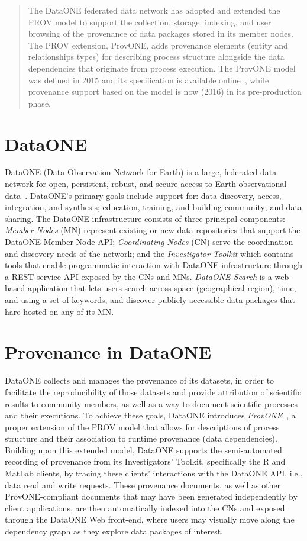 \documentclass[a4paper]{llncs}
\begin{document}
\begin{abstract}
The DataONE federated data network has adopted and extended the PROV model to support the collection, storage, indexing, and user browsing of the provenance of data packages stored in its member nodes. The PROV extension, ProvONE, adds provenance elements (entity and relationships types) for describing process structure alongside the data dependencies that originate from process execution. The ProvONE model was defined in 2015 and its specification is available online~\cite{provone}, while provenance support based on the model is now (2016) in its pre-production phase.
\end{abstract}

\section{DataONE}

DataONE (Data Observation Network for Earth) is a large, federated data network for open, persistent, robust, and secure access to Earth observational data~\cite{dataone}. DataONE's primary goals include support for: data discovery, access, integration, and synthesis; education, training, and building community; and data sharing. The DataONE infrastructure consists of three principal components:
\emph{Member Nodes} (MN) represent existing or new data repositories that support the DataONE Member Node API; \emph{Coordinating Nodes} (CN) serve the coordination and discovery needs of the network; and the \emph{Investigator Toolkit} which contains tools that enable programmatic interaction with DataONE infrastructure through a REST service API exposed by the CNs and MNs.
\textit{DataONE Search} is a web-based application that lets users search across space (geographical region), time, and using a set of keywords, and discover publicly accessible data packages that hare hosted on any of its MN.

\section{Provenance in DataONE}

DataONE collects and manages the provenance of its datasets, in order to facilitate the reproducibility of those datasets and 
provide attribution of scientific results to community members, as well as a way to document scientific processes and their executions. 
%
To achieve these goals, DataONE introduces \textit{ProvONE}~\cite{provone}, a proper extension of the PROV model that allows for descriptions of process structure and their association to runtime provenance (data dependencies).
Building upon this extended model, DataONE supports the semi-automated recording of provenance from its Investigators' Toolkit, specifically the R and MatLab clients, by tracing these clients' interactions with the DataONE API,  i.e., data read and write requests.
These provenance documents, as well as other ProvONE-compliant documents that may have been generated independently by client applications, are then automatically indexed into the CNs and exposed through the DataONE Web front-end, where users may visually move along the dependency graph as they explore data packages of interest.
\end{document}

